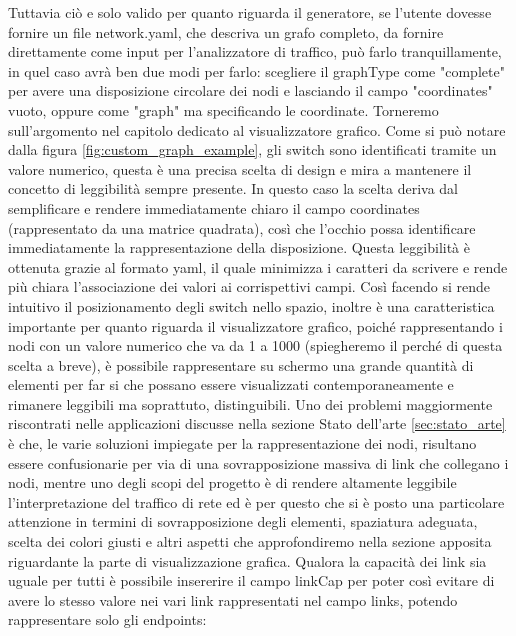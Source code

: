 \documentclass[binding=0.6cm]{sapthesis}
\begin{document}
Tuttavia ciò e solo valido per quanto riguarda il generatore, se l'utente dovesse fornire un file network.yaml, che descriva un grafo completo,
da fornire direttamente come input per l'analizzatore di traffico, può farlo tranquillamente, in quel caso avrà ben due modi per farlo:
scegliere il graphType come "complete" per avere una disposizione circolare dei nodi e lasciando il campo "coordinates" vuoto, oppure come "graph" ma
specificando le coordinate. Torneremo sull'argomento nel capitolo dedicato al visualizzatore grafico.
Come si può notare dalla figura \ref{fig:custom_graph_example}, gli switch sono identificati tramite un valore numerico, 
questa è una precisa scelta di design e mira a mantenere il concetto di leggibilità sempre
presente. In questo caso la scelta deriva dal semplificare e rendere immediatamente chiaro il campo coordinates 
(rappresentato da una matrice quadrata), così che l'occhio possa identificare immediatamente la rappresentazione della disposizione. Questa leggibilità è ottenuta
grazie al formato yaml, il quale minimizza i caratteri da scrivere e rende più chiara l'associazione dei valori ai corrispettivi campi.
Così facendo si rende intuitivo il posizionamento degli switch nello spazio, inoltre è una caratteristica importante per quanto riguarda il
visualizzatore grafico, poiché rappresentando i nodi con un valore numerico che va da 1 a 1000 (spiegheremo il perché di questa scelta a breve), è 
possibile rappresentare su schermo una grande quantità di elementi per far si che possano essere visualizzati contemporaneamente e rimanere leggibili ma soprattuto,
 distinguibili. Uno dei problemi maggiormente riscontrati nelle applicazioni discusse nella sezione Stato dell'arte \ref{sec:stato_arte} è che, le varie soluzioni impiegate
 per la rappresentazione dei nodi, risultano essere confusionarie per via di una sovrapposizione massiva di link che collegano i nodi, mentre uno degli scopi del
 progetto è di rendere altamente leggibile l'interpretazione del traffico di rete ed è per questo che si è posto una particolare attenzione in termini di
 sovrapposizione degli elementi, spaziatura adeguata, scelta dei colori giusti e altri aspetti che approfondiremo nella sezione apposita riguardante la parte
 di visualizzazione grafica.
Qualora la capacità dei link sia uguale per tutti è possibile insererire il campo 
linkCap per poter così evitare di avere lo stesso valore nei vari link rappresentati nel campo links, potendo rappresentare solo gli endpoints:
\end{document}
